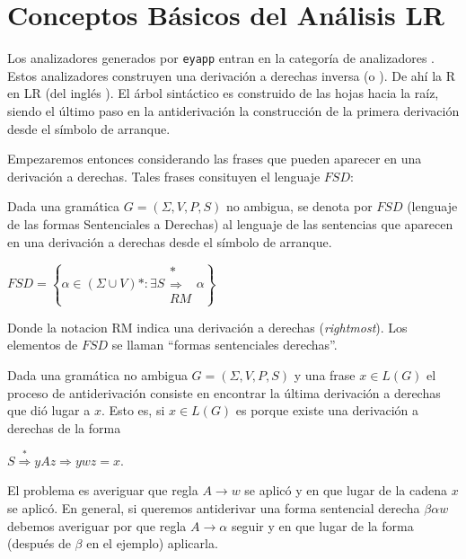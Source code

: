 \section{Conceptos Básicos del Análisis LR}
\label{section:eyappconceptosbasicos}
Los analizadores generados por \verb|eyapp| entran en la categoría de analizadores
. Estos analizadores construyen una derivación a derechas inversa 
(o ).
De ahí la R en LR (del inglés ). El árbol sintáctico 
es construido de las hojas hacia la raíz, siendo el último paso en la antiderivación
la construcción de la primera derivación desde el símbolo de arranque.

Empezaremos entonces considerando las frases que pueden aparecer en una derivación
a derechas. Tales frases consituyen el lenguaje $FSD$:

\begin{definition}
Dada una gramática $G=(\Sigma,V,P,S)$ no ambigua, se denota por $FSD$ 
(lenguaje de las formas Sentenciales a Derechas) al lenguaje de 
las sentencias que aparecen en una derivación a derechas desde el símbolo de arranque.

\begin{center}
$FSD = \left \{ \alpha \in (\Sigma \cup V)* : \exists S \begin{array}{c} *\\ \Longrightarrow \\ {\scriptstyle RM} \end{array} \alpha \right \}$
\end{center}

Donde la notacion RM indica una derivación a derechas (\emph{rightmost}).
Los elementos de $FSD$ se llaman ``formas sentenciales derechas''.
\end{definition}

Dada una gramática no ambigua $G=(\Sigma,V,P,S)$ y una frase $x \in L(G)$ el proceso
de antiderivación consiste en encontrar la última derivación a derechas que dió lugar a 
$x$. Esto es, si $x \in L(G)$ es porque existe una derivación a derechas de la forma

\begin{center}
$S \stackrel{*}{\Longrightarrow} y A z \Longrightarrow y w z = x$. 
\end{center}

El problema es averiguar que regla $A \rightarrow w$ se aplicó y en que lugar 
de la cadena $x$ se aplicó. En general, si queremos antiderivar
una forma sentencial derecha $\beta \alpha w$ 
debemos averiguar por que regla $A \rightarrow \alpha$
seguir y en que lugar de la forma (después de $\beta$ en el ejemplo)
aplicarla. 


